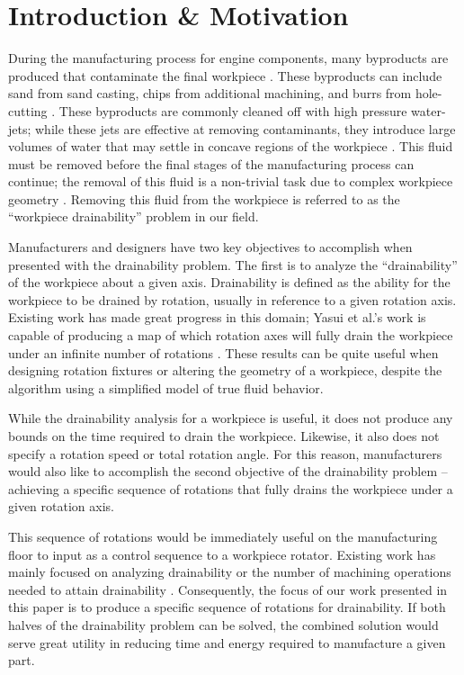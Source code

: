 							\chapter{Introduction \& Motivation}


During the manufacturing process for engine components, many byproducts are produced that contaminate the final workpiece \cite{Hancock94}. These byproducts can include sand from sand casting, chips from additional machining, and burrs from hole-cutting \cite{Arbelaez}.
These byproducts are commonly cleaned off with high pressure water-jets; while these jets are effective at removing contaminants, they introduce large volumes of water that may settle in concave regions of the workpiece \cite{Arbelaez}. This fluid must be removed before the final stages of the manufacturing process can continue; the removal of this fluid is a non-trivial task due to complex workpiece geometry \cite{Avila} \cite{Yasui2011}. Removing this fluid from the workpiece is referred to as the ``workpiece drainability'' problem in our field.

Manufacturers and designers have two key objectives to accomplish when presented with the drainability problem. The first is to analyze the ``drainability'' of the workpiece about a given axis. Drainability is defined as the ability for the workpiece to be drained by rotation, usually in reference to a given rotation axis. Existing work has made great progress in this domain; Yasui et al.'s work is capable of producing a map of which rotation axes will fully drain the workpiece under an infinite number of rotations \cite{Yasui2011}. These results can be quite useful when designing rotation fixtures or altering the geometry of a workpiece, despite the algorithm using a simplified model of true fluid behavior.

While the drainability analysis for a workpiece is useful, it does not produce any bounds on the time required to drain the workpiece. Likewise, it also does not specify a rotation speed or total rotation angle. For this reason, manufacturers would also like to accomplish the second objective of the drainability problem -- achieving a specific sequence of rotations that fully drains the workpiece under a given rotation axis.

This sequence of rotations would be immediately useful on the manufacturing floor to input as a control sequence to a workpiece rotator. Existing work has mainly focused on analyzing drainability \cite{Yasui2011} or the number of machining operations needed to attain drainability \cite{Aloupis_draininga}. Consequently, the focus of our work presented in this paper is to produce a specific sequence of rotations for drainability. If both halves of the drainability problem can be solved, the combined solution would serve great utility in reducing time and energy required to manufacture a given part.

